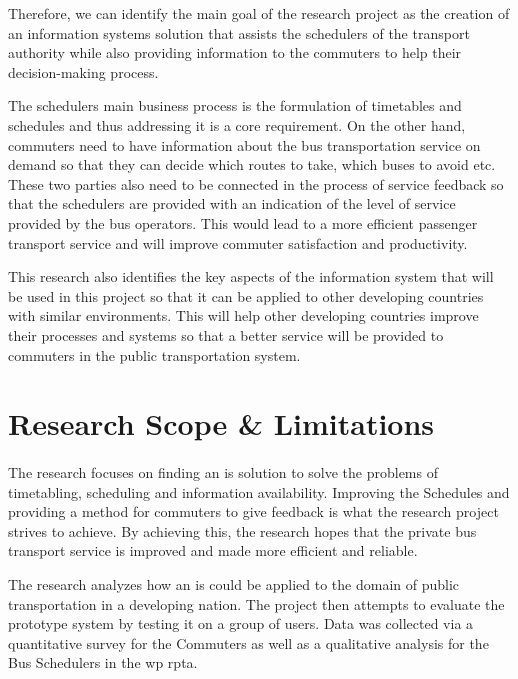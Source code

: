  Therefore, we can identify the main goal of the research project as the creation of an information systems solution that assists the schedulers of the transport authority while also providing information to the commuters to help their decision-making process. 

The schedulers main business process is the formulation of timetables and schedules and thus addressing it is a core requirement. On the other hand, commuters need to have information about the bus transportation service on demand so that they can decide which routes to take, which buses to avoid etc. These two parties also need to be connected in the process of service feedback so that the schedulers are provided with an indication of the level of service provided by the bus operators. This would lead to a more efficient passenger transport service and will improve commuter satisfaction and productivity.

This research also identifies the key aspects of the information system that will be used in this project so that it can be applied to other developing countries with similar environments. This will help other developing countries improve their processes and systems so that a better service will be provided to commuters in the public transportation system.



\section{Research Scope \& Limitations}
\label{section-ResearchScope}

\paragraph{ } The research focuses on finding an \acrshort{is} solution to solve the problems of timetabling, scheduling and information availability. Improving the Schedules and providing a method for commuters to give feedback is what the research project strives to achieve. By achieving this, the research hopes that the private bus transport service is improved and made more efficient and reliable.

The research analyzes how an \acrshort{is} could be applied to the domain of public transportation in a developing nation. The project then attempts to evaluate the prototype system by testing it on a group of users. Data was collected via a quantitative survey for the Commuters as well as a qualitative analysis for the Bus Schedulers in the \acrshort{wp} \acrshort{rpta}.

